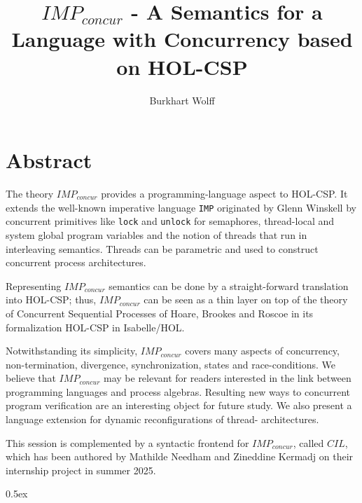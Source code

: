 \documentclass[11pt,a4paper]{book}
\begin{document}
\title{$IMP_{concur}$ - A Semantics for a Language with Concurrency based on HOL-CSP}
\author{Burkhart Wolff}

\maketitle

\chapter*{Abstract}
The theory $IMP_{concur}$  provides a  
programming-language aspect to HOL-CSP. It extends the well-known 
imperative language \verb+IMP+ originated by Glenn Winskell by concurrent
primitives like \verb+lock+ and \verb+unlock+ for semaphores, thread-local and
system global program variables and the notion of threads that run in interleaving
semantics. Threads can be parametric and used to construct concurrent process
architectures.

Representing $IMP_{concur}$ semantics can be done
by a straight-forward translation into HOL-CSP; thus, $IMP_{concur}$ can be seen as
a thin layer on top of the theory of Concurrent Sequential Processes 
of Hoare, Brookes and Roscoe in its formalization HOL-CSP in Isabelle/HOL.

Notwithstanding its simplicity, $IMP_{concur}$ covers many aspects of concurrency, 
non-termination, divergence, synchronization, states and race-conditions.
We believe that $IMP_{concur}$ may be relevant for readers interested in the
link between programming languages and process algebras. Resulting new ways to 
concurrent program verification are an interesting object for future study.
We also present a language extension for dynamic reconfigurations of thread-
architectures. 

This session is complemented by a syntactic frontend for $IMP_{concur}$, called $CIL$,
which has been authored by Mathilde Needham and Zineddine Kermadj on their 
internship project in summer 2025.

\tableofcontents

\pagebreak

\parindent 0pt\parskip 0.5ex





\end{document}
